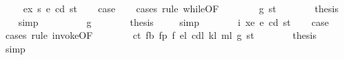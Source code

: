 \begin{isabellebody}
\isamarkupfalse%
\isanewline
\ \ \isamarkupfalse%
\ {\isacharparenleft}{\kern0pt}{}\ ex\ s{}\ e\ cd\ st{\isacharparenright}{\kern0pt}\isanewline
\ \ \isamarkupfalse%
\ {\isacharquery}{\kern0pt}case\isanewline
\ \ \isamarkupfalse%
\ {\isacharparenleft}{\kern0pt}cases\ rule{\isacharcolon}{\kern0pt}\ while{\isacharbrackleft}{\kern0pt}OF\ {}{\isacharparenleft}{\kern0pt}{}{\isacharparenright}{\kern0pt}{\isacharbrackright}{\kern0pt}{\isacharparenright}{\kern0pt}\isanewline
\ \ \ \ \isamarkupfalse%
\ {\isacharparenleft}{\kern0pt}{}\ g\ st{\isacharprime}{\kern0pt}{\isacharprime}{\kern0pt}{\isacharparenright}{\kern0pt}\isanewline
\ \ \ \ \isamarkupfalse%
\ \isamarkupfalse%
\ {\isacharquery}{\kern0pt}thesis\ \isamarkupfalse%
\ {}\ \isamarkupfalse%
\ simp\isanewline
\ \ \isamarkupfalse%
\isanewline
\ \ \ \ \isamarkupfalse%
\ {\isacharparenleft}{\kern0pt}{}\ g{\isacharparenright}{\kern0pt}\isanewline
\ \ \ \ \isamarkupfalse%
\ \isamarkupfalse%
\ {\isacharquery}{\kern0pt}thesis\ \isamarkupfalse%
\ {}\ \isamarkupfalse%
\ simp\isanewline
\ \ \isamarkupfalse%
\isanewline
{}\isamarkupfalse%
\isanewline
\ \ \isamarkupfalse%
\ {\isacharparenleft}{\kern0pt}{}\ i\ xe\ e\ cd\ st{\isacharparenright}{\kern0pt}\isanewline
\ \ \isamarkupfalse%
\ {\isacharquery}{\kern0pt}case\isanewline
\ \ \isamarkupfalse%
\ {\isacharparenleft}{\kern0pt}cases\ rule{\isacharcolon}{\kern0pt}\ invoke{\isacharbrackleft}{\kern0pt}OF\ {}{\isacharparenleft}{\kern0pt}{}{\isacharparenright}{\kern0pt}{\isacharbrackright}{\kern0pt}{\isacharparenright}{\kern0pt}\isanewline
\ \ \ \ \isamarkupfalse%
\ {\isacharparenleft}{\kern0pt}{}\ ct\ fb\ fp\ f\ e\isactrlsub l\ cd\isactrlsub l\ k\isactrlsub l\ m\isactrlsub l\ g\ st{\isacharprime}{\kern0pt}{\isacharprime}{\kern0pt}{\isacharparenright}{\kern0pt}\isanewline
\ \ \ \ \isamarkupfalse%
\ \isamarkupfalse%
\ {\isacharquery}{\kern0pt}thesis\ \isamarkupfalse%
\ {}\ \isamarkupfalse%
\ simp\isanewline
\ \ \isamarkupfalse%
\isanewline
{}\isamarkupfalse%
\isanewline
\ \ \isamarkupfalse%

\end{isabellebody}
